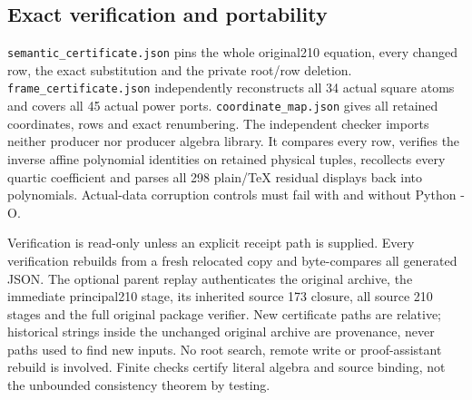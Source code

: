 \subsection{Exact verification and
portability}\label{exact-verification-and-portability}

\nolinkurl{semantic_certificate.json} pins the whole original210 equation,
every changed row, the exact substitution and the private root/row
deletion. \nolinkurl{frame_certificate.json} independently reconstructs
all 34 actual square atoms and covers all 45 actual power ports.
\nolinkurl{coordinate_map.json} gives all retained coordinates, rows and
exact renumbering. The independent checker imports neither producer nor
producer algebra library. It compares every row, verifies the inverse
affine polynomial identities on retained physical tuples, recollects
every quartic coefficient and parses all 298 plain/TeX residual displays
back into polynomials. Actual-data corruption controls must fail with
and without Python -O.

Verification is read-only unless an explicit receipt path is supplied.
Every verification rebuilds from a fresh relocated copy and
byte-compares all generated JSON. The optional parent replay
authenticates the original archive, the immediate principal210 stage,
its inherited source 173 closure, all source 210 stages and the full
original package verifier. New certificate paths are relative;
historical strings inside the unchanged original archive are provenance,
never paths used to find new inputs. No root search, remote write or
proof-assistant rebuild is involved. Finite checks certify literal
algebra and source binding, not the unbounded consistency theorem by
testing.
